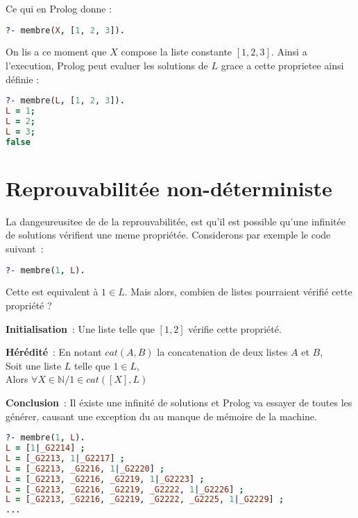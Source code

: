  Ce qui en Prolog donne :
\begin{lstlisting}[language=Prolog]
?- membre(X, [1, 2, 3]).
\end{lstlisting}

On lis a ce moment que $X$ compose la liste constante $[1, 2, 3]$. Ainsi a
l'execution, Prolog peut evaluer les solutions de $L$ grace a cette proprietee
ainsi définie :

\begin{lstlisting}[language=Prolog]
?- membre(L, [1, 2, 3]).
L = 1;
L = 2;
L = 3;
false
\end{lstlisting}


\section{Reprouvabilitée non-déterministe}

La dangeureusitee de de la reprouvabilitée, est qu'il est possible qu'une
infinitée de solutions vérifient une meme propriétée. Considerons par exemple
le code suivant~:

\begin{lstlisting}[language=Prolog]
?- membre(1, L).
\end{lstlisting}

Cette est equivalent à $1 \in L$. Mais alors, combien de listes
pourraient vérifié cette propriété ?

\textbf{Initialisation}~: Une liste telle que $[1, 2]$ vérifie cette propriété.

\textbf{Hérédité}~: En notant $cat(A, B)$ la concatenation de deux listes $A$ et
$B$,\\
Soit une liste $L$ telle que $1 \in L$,\\
Alors $\forall X \in \mathbb{N} / 1 \in cat([X], L)$

\textbf{Conclusion}~: Il éxiste une infinité de solutions et Prolog va essayer
de toutes les générer, causant une exception du au manque de mémoire de la
machine.

\begin{lstlisting}[language=Prolog]
?- membre(1, L).
L = [1|_G2214] ;
L = [_G2213, 1|_G2217] ;
L = [_G2213, _G2216, 1|_G2220] ;
L = [_G2213, _G2216, _G2219, 1|_G2223] ;
L = [_G2213, _G2216, _G2219, _G2222, 1|_G2226] ;
L = [_G2213, _G2216, _G2219, _G2222, _G2225, 1|_G2229] ;
...
\end{lstlisting}
